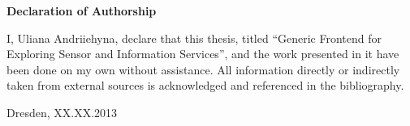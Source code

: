 \documentclass[a4paper, 12pt, twoside]{book}
\begin{document}
	

\newpage
\thispagestyle{empty}
\mbox{}

\newpage
\thispagestyle{empty}
\begingroup
  \vspace*{50 mm}
  {\huge \bf Declaration of Authorship}
  \vspace{10 mm}

  I, Uliana Andriiehyna, declare that this thesis, titled ``Generic Frontend for Exploring Sensor and Information Services'', and the work presented in it have been done on my own without assistance. All information directly or indirectly taken from external sources is acknowledged and referenced in the bibliography.

  \vspace{10 mm}

  Dresden, XX.XX.2013 \hspace{6.0 cm} \makebox[1.5in]{\hrulefill}
\endgroup


\newpage
\thispagestyle{empty}
\mbox{}
\clearpage

\tableofcontents

\newpage
\thispagestyle{empty}
\mbox{}
\clearpage

\setcounter{page}{1}

	
	
	
	
	
	
  \listoffigures
  \listoftables
  
\end{document}
